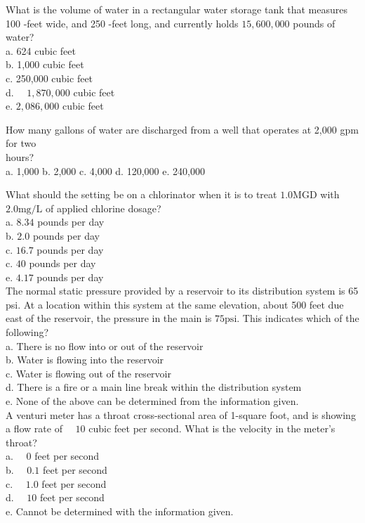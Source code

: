What is the volume of water in a rectangular water storage tank that measures 100 -feet wide, and 250 -feet long, and currently holds $15,600,000$ pounds of water?\\
a. 624 cubic feet\\
b. 1,000 cubic feet\\
c.  250,000 cubic feet\\
d. $\quad 1,870,000$ cubic feet\\
e. $2,086,000$ cubic feet 

How many gallons of water are discharged from a well that operates at 2,000 gpm for two\\
hours?\\
a. 1,000 
b. 2,000 
c. 4,000  
d. 120,000 
e. 240,000 


What should the setting be on a chlorinator when it is to treat $1.0 \mathrm{MGD}$ with $2.0 \mathrm{mg} / \mathrm{L}$ of applied chlorine dosage?\\
a. $8.34$ pounds per day\\
b. $2.0$ pounds per day\\
c.  $16.7$ pounds per day\\
c.  $40$ pounds per day\\
e. $4.17$ pounds per day\\

The normal static pressure provided by a reservoir to its distribution system is 65 psi. At a location within this system at the same elevation, about 500 feet due east of the reservoir, the pressure in the main is $75 \mathrm{psi}$. This indicates which of the following?\\
a. There is no flow into or out of the reservoir\\
b. Water is flowing into the reservoir\\
c. Water is flowing out of the reservoir\\
d. There is a fire or a main line break within the distribution system\\
e. None of the above can be determined from the information given.\\

A venturi meter has a throat cross-sectional area of 1-square foot, and is showing a flow rate of $\quad 10$ cubic feet per second. What is the velocity in the meter's throat?\\
a. $\quad 0$ feet per second\\
b. $\quad 0.1$ feet per second\\
c. $\quad 1.0$ feet per second\\
d. $\quad 10$ feet per second\\
e. Cannot be determined with the information given. 

